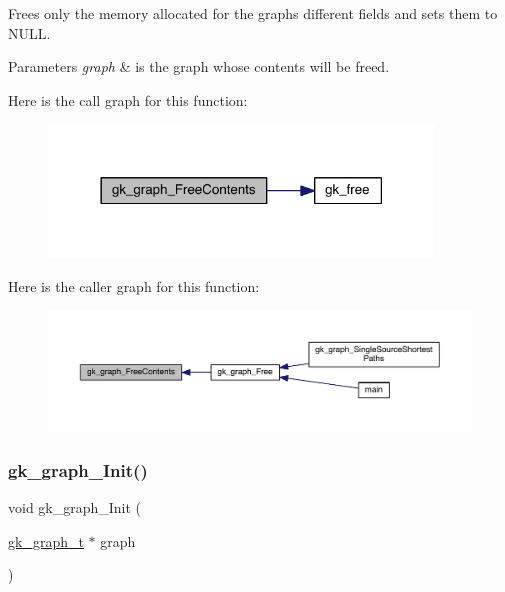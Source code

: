 Frees only the memory allocated for the graph\textquotesingle{}s different fields and sets them to N\+U\+LL. 
\begin{DoxyParams}{Parameters}
{\em graph} & is the graph whose contents will be freed. \\
\hline
\end{DoxyParams}
Here is the call graph for this function\+:\nopagebreak
\begin{figure}[H]
\begin{center}
\leavevmode
\includegraphics[width=290pt]{a00846_a00a7be5e2819fb9444360695e8d047d3_cgraph}
\end{center}
\end{figure}
Here is the caller graph for this function\+:\nopagebreak
\begin{figure}[H]
\begin{center}
\leavevmode
\includegraphics[width=350pt]{a00846_a00a7be5e2819fb9444360695e8d047d3_icgraph}
\end{center}
\end{figure}
\mbox{\label{a00846_ab017e0e6f2436f3ad24ea01d8b2c588c}} 
\subsubsection{\texorpdfstring{gk\+\_\+graph\+\_\+\+Init()}{gk\_graph\_Init()}}
{\footnotesize\ttfamily void gk\+\_\+graph\+\_\+\+Init (\begin{DoxyParamCaption}\item[{\hyperlink{a00638}{gk\+\_\+graph\+\_\+t} $\ast$}]{graph }\end{DoxyParamCaption})}

